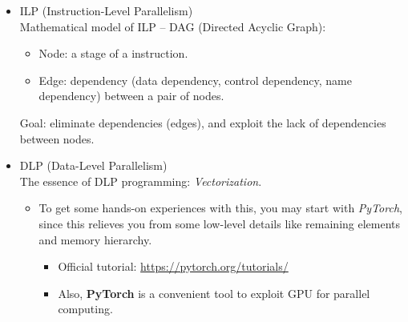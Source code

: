 \documentclass{article}
\begin{document}
\begin{itemize}
    \item ILP (Instruction-Level Parallelism)\\
    Mathematical model of ILP -- DAG (Directed Acyclic Graph):
    \begin{itemize}
        \item Node: a stage of a instruction.
        \item Edge: dependency (data dependency, control dependency, name dependency) between a pair of nodes.
    \end{itemize}
    Goal:
    eliminate dependencies (edges), and exploit the lack of dependencies between nodes.
    \item DLP (Data-Level Parallelism)\\
        The essence of DLP programming: \emph{Vectorization}.
        \begin{itemize}
            \item To get some hands-on experiences with this, you may start with \emph{PyTorch}, since this relieves you from some low-level details like remaining elements and memory hierarchy.
            \begin{itemize}
                \item Official tutorial: \href{https://pytorch.org/tutorials/}{https://pytorch.org/tutorials/}
                \item Also, \textbf{PyTorch} is a convenient tool to exploit GPU for parallel computing.
            \end{itemize}
        \end{itemize}
        

\end{itemize}
\end{document}
